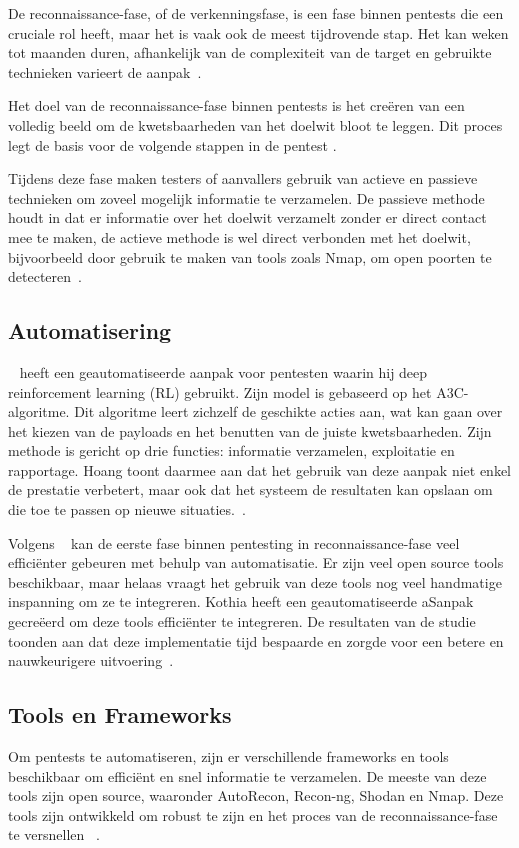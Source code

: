 De reconnaissance-fase, of de verkenningsfase, is een fase binnen pentests die een cruciale rol heeft, maar het is vaak ook de meest tijdrovende stap.
Het kan weken tot maanden duren, afhankelijk van de complexiteit van de target en gebruikte technieken varieert de aanpak~\autocite{Shah}. 

Het doel van de reconnaissance-fase binnen pentests is het creëren van een volledig beeld om de 
kwetsbaarheden van het doelwit bloot te leggen. Dit proces legt de basis voor de
volgende stappen in de pentest \autocite{Kothia}.

Tijdens deze fase maken testers of aanvallers gebruik van actieve en passieve technieken om zoveel
mogelijk informatie te verzamelen. De passieve methode houdt in dat er informatie over het doelwit verzamelt zonder er direct contact mee te maken, 
de actieve methode is wel direct verbonden met het doelwit, bijvoorbeeld door gebruik te maken van tools zoals Nmap, om open poorten te detecteren~\autocite{Shah}.

\subsection{Automatisering}

~\textcite{Hoang} heeft een geautomatiseerde aanpak voor pentesten waarin hij deep reinforcement 
learning (RL) gebruikt. Zijn model is gebaseerd op het A3C-algoritme. Dit algoritme leert zichzelf de geschikte acties aan, wat kan 
gaan over het kiezen van de payloads en het benutten van de juiste kwetsbaarheden. Zijn methode is gericht op drie functies: informatie verzamelen, 
exploitatie en rapportage. Hoang toont daarmee aan dat het gebruik van deze aanpak niet enkel de prestatie verbetert, maar ook dat het systeem de resultaten 
kan opslaan om die toe te passen op nieuwe situaties.~\autocite{Hoang}.


Volgens ~\textcite{Kothia} kan de eerste fase binnen pentesting in reconnaissance-fase veel 
efficiënter gebeuren met behulp van automatisatie. Er zijn veel open source tools beschikbaar, maar helaas vraagt het gebruik van deze 
tools nog veel handmatige inspanning om ze te integreren. Kothia heeft een geautomatiseerde aSanpak gecreëerd om deze tools
efficiënter te integreren. De resultaten van de studie toonden aan dat deze implementatie tijd 
bespaarde en zorgde voor een betere en nauwkeurigere uitvoering~\autocite{Kothia}.


\subsection{Tools en Frameworks}
 Om pentests te automatiseren, zijn er verschillende frameworks en tools beschikbaar om 
efficiënt en snel informatie te verzamelen. De meeste van deze tools zijn open source, waaronder 
AutoRecon, Recon-ng, Shodan en Nmap. Deze tools zijn ontwikkeld om robust te zijn en het proces van de reconnaissance-fase te versnellen ~\autocite{Shebli}.


